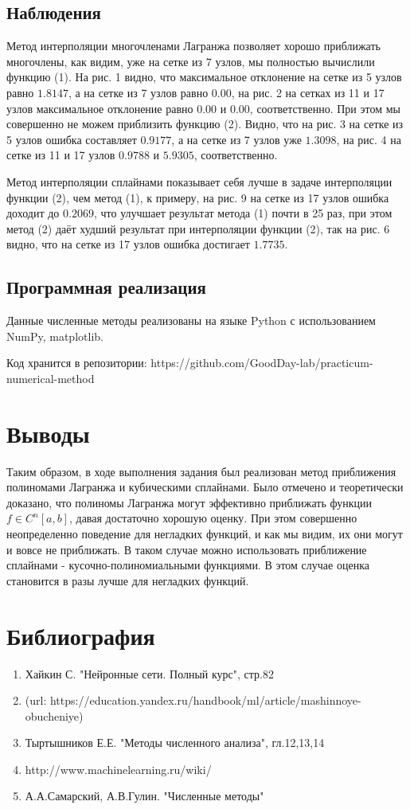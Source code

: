 \documentclass{article}
\begin{document}
\subsection{Наблюдения}
Метод интерполяции многочленами Лагранжа позволяет хорошо приближать многочлены, как видим, уже на сетке из 7 узлов, мы полностью вычислили функцию (1). На рис. 1 видно, что максимальное отклонение на сетке из 5 узлов равно \(1.8147\), а на сетке из 7 узлов равно \(0.00\), на рис. 2 на сетках из 11 и 17 узлов максимальное отклонение равно \(0.00\) и \(0.00\), соответственно.
При этом мы совершенно не можем приблизить функцию (2).
Видно, что на рис. 3 на сетке из 5 узлов ошибка составляет \(0.9177\), а на сетке из 7 узлов уже \(1.3098\), на рис. 4 на сетке из 11 и 17 узлов \(0.9788\) и \(5.9305\), соответственно.

Метод интерполяции сплайнами показывает себя лучше в задаче интерполяции функции (2), чем метод (1), к примеру, на рис. 9 на сетке из 17 узлов ошибка доходит до \(0.2069\), что улучшает результат метода (1) почти в 25 раз, при этом метод (2) даёт худший результат при интерполяции функции (2), так на рис. 6 видно, что на сетке из 17 узлов ошибка достигает \(1.7735\).

\subsection{Программная реализация}
Данные численные методы реализованы на языке Python с использованием NumPy, matplotlib.

Код хранится в репозитории: 
https://github.com/GoodDay-lab/practicum-numerical-method

\section{Выводы}
Таким образом, в ходе выполнения задания был реализован метод приближения полиномами Лагранжа и кубическими сплайнами. Было отмечено и теоретически доказано, что полиномы Лагранжа могут эффективно приближать функции \(f \in C^n[a,b]\), давая достаточно хорошую оценку. При этом совершенно неопределенно поведение для негладких функций, и как мы видим, их они могут и вовсе не приближать. В таком случае можно использовать приближение сплайнами - кусочно-полиномиальными функциями. В этом случае оценка становится в разы лучше для негладких функций.


\section{Библиография}
\begin{enumerate}
    \item Хайкин С. "Нейронные сети. Полный курс", стр.82
    \item (url: https://education.yandex.ru/handbook/ml/article/mashinnoye-obucheniye)
    \item Тыртышников Е.Е. "Методы численного анализа", гл.12,13,14
    \item http://www.machinelearning.ru/wiki/
    \item А.А.Самарский, А.В.Гулин.  "Численные методы"
\end{enumerate}
\end{document}
